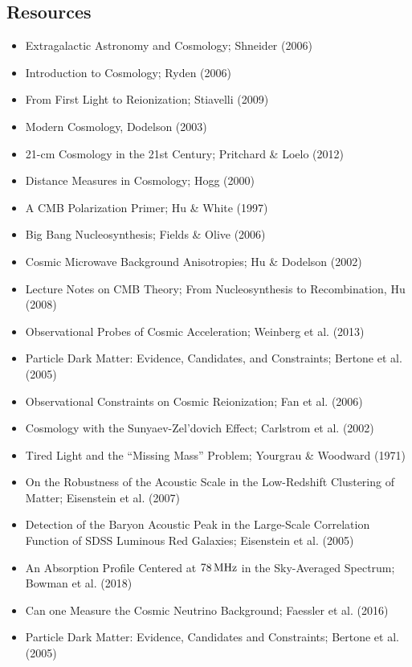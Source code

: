 \documentclass[a4paper,11pt]{article}
\begin{document}

\newpage
\subsection{Resources}

\begin{itemize}
    \item Extragalactic Astronomy and Cosmology; Shneider (2006)
    \item Introduction to Cosmology; Ryden (2006)
    \item From First Light to Reionization; Stiavelli (2009)
    \item Modern Cosmology, Dodelson (2003)
    \item 21-cm Cosmology in the 21st Century; Pritchard \& Loelo (2012)
    \item Distance Measures in Cosmology; Hogg (2000)
    \item A CMB Polarization Primer; Hu \& White (1997)
    \item Big Bang Nucleosynthesis; Fields \& Olive (2006)
    \item Cosmic Microwave Background Anisotropies; Hu \& Dodelson (2002)
    \item Lecture Notes on CMB Theory; From Nucleosynthesis to Recombination, Hu (2008)
    \item Observational Probes of Cosmic Acceleration; Weinberg et al. (2013)
    \item Particle Dark Matter: Evidence, Candidates, and Constraints; Bertone et al. (2005)
    \item Observational Constraints on Cosmic Reionization; Fan et al. (2006)
    \item Cosmology with the Sunyaev-Zel'dovich Effect; Carlstrom et al. (2002)
    \item Tired Light and the ``Missing Mass'' Problem; Yourgrau \& Woodward (1971)
    \item On the Robustness of the Acoustic Scale in the Low-Redshift Clustering of Matter; Eisenstein et al. (2007)
    \item Detection of the Baryon Acoustic Peak in the Large-Scale Correlation Function of SDSS Luminous Red Galaxies; Eisenstein et al. (2005)
    \item An Absorption Profile Centered at $78\,{\rm MHz}$ in the Sky-Averaged Spectrum; Bowman et al. (2018)
    \item Can one Measure the Cosmic Neutrino Background; Faessler et al. (2016)
    \item Particle Dark Matter: Evidence, Candidates and Constraints; Bertone et al. (2005)
\end{itemize}
\end{document}
